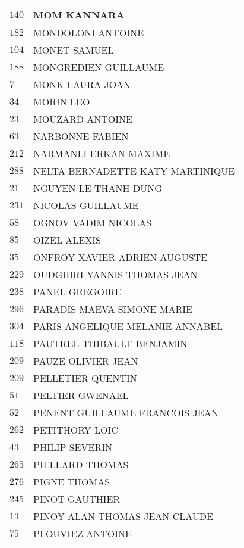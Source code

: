 \begin{xltabular}{\linewidth}{|l|X|}
    \hline
    $140$ & MOM KANNARA \\
    \hline
    $182$ & MONDOLONI ANTOINE \\
    \hline
    $104$ & MONET SAMUEL \\
    \hline
    $188$ & MONGREDIEN GUILLAUME \\
    \hline
    $7$ & MONK LAURA JOAN \\
    \hline
    $34$ & MORIN LEO \\
    \hline
    $23$ & MOUZARD ANTOINE \\
    \hline
    $63$ & NARBONNE FABIEN \\
    \hline
    $212$ & NARMANLI ERKAN MAXIME \\
    \hline
    $288$ & NELTA BERNADETTE KATY MARTINIQUE \\
    \hline
    $21$ & NGUYEN LE THANH DUNG \\
    \hline
    $231$ & NICOLAS GUILLAUME \\
    \hline
    $58$ & OGNOV VADIM NICOLAS \\
    \hline
    $85$ & OIZEL ALEXIS \\
    \hline
    $35$ & ONFROY XAVIER ADRIEN AUGUSTE \\
    \hline
    $229$ & OUDGHIRI YANNIS THOMAS JEAN \\
    \hline
    $238$ & PANEL GREGOIRE \\
    \hline
    $296$ & PARADIS MAEVA SIMONE MARIE \\
    \hline
    $304$ & PARIS ANGELIQUE MELANIE ANNABEL \\
    \hline
    $118$ & PAUTREL THIBAULT BENJAMIN \\
    \hline
    $209$ & PAUZE OLIVIER JEAN \\
    \hline
    $209$ & PELLETIER QUENTIN \\
    \hline
    $51$ & PELTIER GWENAEL \\
    \hline
    $52$ & PENENT GUILLAUME FRANCOIS JEAN \\
    \hline
    $262$ & PETITHORY LOIC \\
    \hline
    $43$ & PHILIP SEVERIN \\
    \hline
    $265$ & PIELLARD THOMAS \\
    \hline
    $276$ & PIGNE THOMAS \\
    \hline
    $245$ & PINOT GAUTHIER \\
    \hline
    $13$ & PINOY ALAN THOMAS JEAN CLAUDE \\
    \hline
    $75$ & PLOUVIEZ ANTOINE \\

\end{xltabular}

